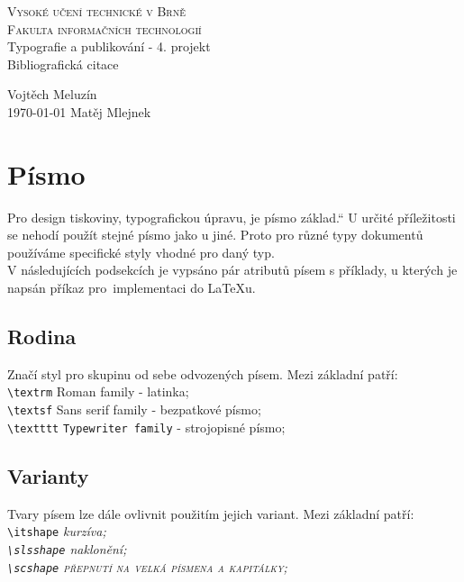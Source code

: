 \documentclass[a4paper, 11pt]{article}
\providecommand{\uv}[1]{\quotedblbase #1\textquotedblleft}
\begin{document}
\pagestyle{empty}
\begin{center}
\Huge
\textsc{Vysoké učení technické v Brně}\\
\huge
\textsc{Fakulta informačních technologií}\\
\LARGE
{}
Typografie a publikování - 4. projekt\\ \Huge Bibliografická citace
\end{center}
{
\LARGE \hfill
Vojtěch Meluzín \\
\today \hfill
Matěj Mlejnek
}

\newpage
\setcounter{page}{1}
\pagestyle{plain}

\section{Písmo}
\uv{Pro design tiskoviny, typografickou úpravu, je písmo základ.} \cite{jak_publikovat_napocitaci}
U určité příležitosti se nehodí použít stejné písmo jako u jiné. Proto pro různé typy 
dokumentů používáme specifické styly vhodné pro daný typ. \cite{dipl_martin_cerny, typografia_cz}\\ 
V následujících podsekcích je vypsáno pár atributů písem s příklady, u kterých je napsán příkaz pro~implementaci do \LaTeX u. 
\subsection{Rodina}
Značí styl pro skupinu od sebe odvozených písem. Mezi základní patří: \\ 
\verb|\textrm| \hspace{0.5cm} \textrm{Roman family} - latinka;\\
\verb|\textsf| \hspace{0.5cm} \textsf{Sans serif family} - bezpatkové písmo;\\
\verb|\textttt| \hspace{0.3cm} \texttt{Typewriter family} - strojopisné písmo;
\cite{latex_kompletni_pruvodce, typograficky_manual}


\subsection{Varianty}
Tvary písem lze dále ovlivnit použitím jejich variant. Mezi základní patří: \\
\verb|\itshape| \hspace{0.5cm} \itshape{kurzíva;} \\
\verb|\slsshape| \hspace{0.28cm} \slshape{naklonění;} \\
\verb|\scshape| \hspace{0.5cm} \scshape přepnutí na velká písmena a kapitálky; \normalfont
\cite{latex_kompletni_pruvodce, typograficky_manual}
\end{document}
